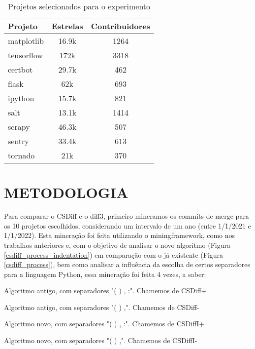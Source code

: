 \begin{table}[ht]
	\begin{center}
		\begin{tabular}{|l|c|c|}
			\hline
			\textbf{Projeto} & \textbf{Estrelas} & \textbf{Contribuidores} \\
			\hline
			matplotlib       & 16.9k             & 1264                    \\
			tensorflow       & 172k              & 3318                    \\
			certbot          & 29.7k             & 462                     \\
			flask            & 62k               & 693                     \\
			ipython          & 15.7k             & 821                     \\
			salt             & 13.1k             & 1414                    \\
			scrapy           & 46.3k             & 507                     \\
			sentry           & 33.4k             & 613                     \\
			tornado          & 21k               & 370                     \\
			\hline
		\end{tabular}
	\end{center}
	\caption{Projetos selecionados para o experimento}\label{tabela_projeto}
\end{table}

\section{METODOLOGIA}\label{metodologia}
Para comparar o CSDiff e o diff3, primeiro mineramos os commits de merge para os 10 projetos escolhidos, considerando um
intervalo de um ano (entre 1/1/2021 e 1/1/2022). Esta mineração foi feita utilizando o miningframework, como nos trabalhos
anteriores e, com o objetivo de analisar o novo algoritmo (Figura \ref{csdiff_process_indentation}) em comparação com o já
existente (Figura \ref{csdiff_process}), bem como analisar a influência da escolha de certos separadores para a linguagem Python,
essa mineração foi feita 4 vezes, a saber:

\begin{compactenum}[(1)]
	\item Algoritmo antigo, com separadores "( ) , :". Chamemos de CSDiff+
	\item Algoritmo antigo, com separadores "( ) ,". Chamemos de CSDiff-
	\item Algoritmo novo, com separadores "( ) , :". Chamemos de CSDiffI+
	\item Algoritmo novo, com separadores "( ) ,". Chamemos de CSDiffI-
\end{compactenum}

